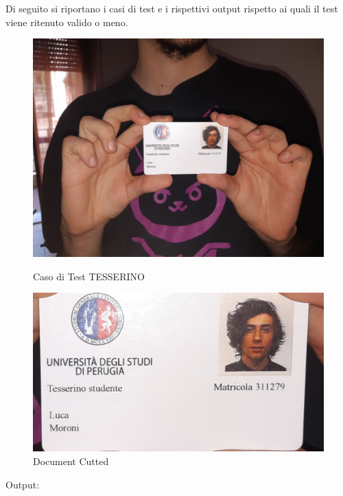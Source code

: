 \documentclass[12pt,a4paper]{article}
\begin{document}
Di seguito si riportano i casi di test e i rispettivi output rispetto ai
quali il test viene ritenuto valido o meno.


\begin{figure}[!htb]
   \begin{minipage}{0.48\textwidth}
     \centering
     \includegraphics[width=.7\linewidth]{test_tesserino.jpg}
     \caption{Caso di Test TESSERINO}\label{Fig:}
   \end{minipage}\hfill
   \begin{minipage}{0.48\textwidth}
     \centering
     \includegraphics[width=.7\linewidth]{test_tesserino_cutting.jpg}
     \caption{Document Cutted}\label{Fig:}
   \end{minipage}
\end{figure}

Output:
\inputminted{python}{test_tesserino.py}
\end{document}
